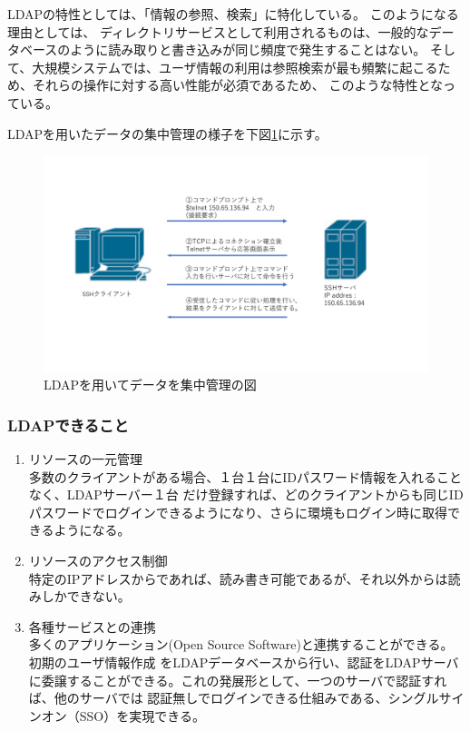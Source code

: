 \documentclass[11pt,a4j,titlepage]{jreport}
\begin{document}
LDAPの特性としては、「情報の参照、検索」に特化している。
このようになる理由としては、
ディレクトリサービスとして利用されるものは、一般的なデータベースのように読み取りと書き込みが同じ頻度で発生することはない。
そして、大規模システムでは、ユーザ情報の利用は参照検索が最も頻繁に起こるため、それらの操作に対する高い性能が必須であるため、
このような特性となっている。

LDAPを用いたデータの集中管理の様子を下図\ref{LDAP_data_manage}に示す。
\begin{figure}[h]
    \centering
    \includegraphics[width=1.0\textwidth, page=10]{graphs/network_archtecture.pdf}
    \caption{LDAPを用いてデータを集中管理の図}
    \label{LDAP_data_manage}
\end{figure}


\subsubsection*{LDAPできること}
\begin{enumerate}
    \item リソースの一元管理\mbox{}\\多数のクライアントがある場合、１台１台にIDパスワード情報を入れることなく、LDAPサーバー１台
だけ登録すれば、どのクライアントからも同じIDパスワードでログインできるようになり、さらに環境もログイン時に取得できるようになる。


    \item リソースのアクセス制御\mbox{}\\特定のIPアドレスからであれば、読み書き可能であるが、それ以外からは読みしかできない。
    \item 各種サービスとの連携\mbox{}\\多くのアプリケーション(Open Source Software)と連携することができる。初期のユーザ情報作成
をLDAPデータベースから行い、認証をLDAPサーバに委譲することができる。これの発展形として、一つのサーバで認証すれば、他のサーバでは
認証無しでログインできる仕組みである、シングルサインオン（SSO）を実現できる。
\end{enumerate}
\end{document}
